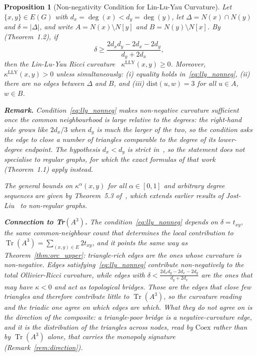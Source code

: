 \documentclass[11pt,a4paper]{article}
\newtheorem{proposition}{Proposition}
\begin{document}
\begin{proposition}[Non-negativity Condition for Lin-Lu-Yau Curvature]
\label{prop:orc_nonneg}
Let $\{x,y\} \in E(G)$ with $d_x = \deg(x) < d_y = \deg(y)$, let
$\Delta = N(x) \cap N(y)$ and $\delta = |\Delta|$, and write
$A = N(x)\setminus N[y]$ and $B = N(y)\setminus N[x]$.
By~\cite{lly2026nonreg} (Theorem~1.2), if
\begin{equation}
\delta \geq \frac{2d_x d_y - 2d_x - 2d_y}{d_y + 2d_x},
\label{eq:lly_nonneg}
\end{equation}
then the Lin-Lu-Yau Ricci curvature~\cite{lin2011}
$\kappa^{\mathrm{LLY}}(x,y) \geq 0$.
Moreover, $\kappa^{\mathrm{LLY}}(x,y) > 0$ unless simultaneously:
(i) equality holds in~\eqref{eq:lly_nonneg},
(ii) there are no edges between $\Delta$ and $B$, and
(iii) $\mathrm{dist}(u,w) = 3$ for all $u \in A$, $w \in B$.

\textbf{Remark.} Condition~\eqref{eq:lly_nonneg} makes non-negative curvature
sufficient once the common neighbourhood is \emph{large} relative to the
degrees: the right-hand side grows like $2d_x/3$ when $d_y$ is much the larger
of the two, so the condition asks the edge to close a number of triangles
comparable to the degree of its lower-degree endpoint. The hypothesis
$d_x < d_y$ is strict in~\cite{lly2026nonreg}, so the statement does not
specialise to regular graphs, for which the exact formulas of that work
(Theorem~1.1) apply instead.

The general bounds on $\kappa^\alpha(x,y)$ for all $\alpha \in [0,1]$ and
arbitrary degree sequences are given by Theorem~5.3 of~\cite{lly2026nonreg},
which extends earlier results of Jost-Liu~\cite{jost2014} to non-regular graphs.

\textbf{Connection to Tr$(A^3)$.} The condition~\eqref{eq:lly_nonneg}
depends on $\delta = t_{xy}$, the same common-neighbour count that
determines the local contribution to $\operatorname{Tr}(A^3) =
\sum_{(x,y)\in E} 2 t_{xy}$, and it points the same way as
Theorem~\ref{thm:orc_upper}: triangle-rich edges are the ones whose curvature
is non-negative. Edges satisfying~\eqref{eq:lly_nonneg}
contribute non-negatively to the total Ollivier-Ricci curvature,
while edges with $\delta < \frac{2d_x d_y - 2d_x - 2d_y}{d_y + 2d_x}$
are the ones that may have $\kappa < 0$ and act as topological bridges. Those
are the edges that close few triangles and therefore contribute little to
$\operatorname{Tr}(A^3)$, so the curvature reading and the triadic one agree on
which edges are which. What they do \emph{not} agree on is the direction of the
composite: a triangle-poor bridge is a negative-curvature edge, and it is the
distribution of the triangles across nodes, read by $\mathrm{Coex}$ rather than
by $\operatorname{Tr}(A^3)$ alone, that carries the monopoly signature
(Remark~\ref{rem:direction}).
\end{proposition}
\end{document}
